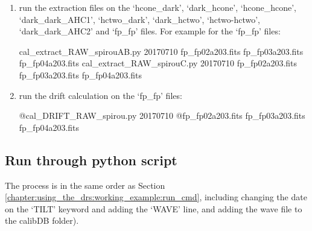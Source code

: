 \begin{enumerate}
\item run the extraction files on the `hcone\_dark', `dark\_hcone', `hcone\_hcone', `dark\_dark\_AHC1', `hctwo\_dark', `dark\_hctwo', `hctwo-hctwo', `dark\_dark\_AHC2' and `fp\_fp'  files. For example for the `fp\_fp' files:
\begin{cmdbox}
cal_extract_RAW_spirouAB.py 20170710 fp_fp02a203.fits fp_fp03a203.fits fp_fp04a203.fits
cal_extract_RAW_spirouC.py 20170710 fp_fp02a203.fits fp_fp03a203.fits fp_fp04a203.fits
\end{cmdbox}

\item run the drift calculation on the `fp\_fp' files:
\begin{cmdbox}
@cal_DRIFT_RAW_spirou.py 20170710 @fp_fp02a203.fits fp_fp03a203.fits fp_fp04a203.fits
\end{cmdbox}

\end{enumerate}

\clearpage
\newpage
\subsection{Run through python script}
\label{chapter:using_the_drs:working_example:run_python}

The process is in the same order as Section \ref{chapter:using_the_drs:working_example:run_cmd}, including changing the date on the `TILT' keyword and adding the `WAVE' line, and adding the wave file to the calibDB folder).

